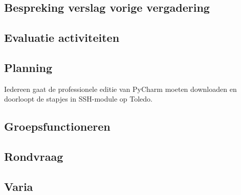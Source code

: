 \documentclass[a4paper,kulak]{kulakarticle} %
\begin{document}
\subsection{Bespreking verslag vorige vergadering}

\subsection{Evaluatie activiteiten}

\subsection{Planning}
Iedereen gaat de professionele editie van PyCharm moeten downloaden en doorloopt de stapjes in SSH-module op Toledo. 
\subsection{Groepsfunctioneren}

\subsection{Rondvraag}

\subsection{Varia}
\end{document}
